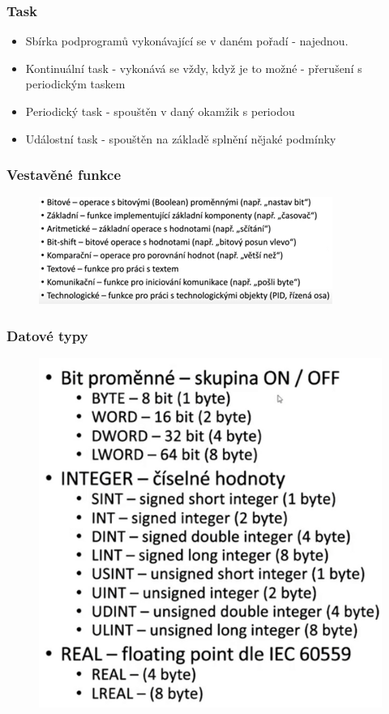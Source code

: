 \subsubsection*{Task}
\begin{itemize}
    \item Sbírka podprogramů vykonávající se v daném pořadí - najednou.
    \item Kontinuální task - vykonává se vždy, když je to možné - přerušení s periodickým taskem
    \item Periodický task - spouštěn v daný okamžik s periodou
    \item Událostní task - spouštěn na základě splnění nějaké podmínky
\end{itemize}

\subsubsection*{Vestavěné funkce}
\begin{figure}[h]
    \includegraphics[scale = 0.85]{img/Picture15.png}
\end{figure}

\subsubsection*{Datové typy}
\begin{figure}[!h]
    \includegraphics[scale = 0.85]{img/Picture16.png}
\end{figure}

